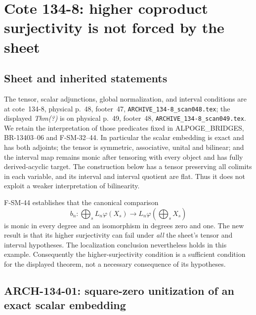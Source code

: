 \section{Cote 134-8: higher coproduct surjectivity is not forced by the sheet}
\label{sec:arch134}

\subsection{Sheet and inherited statements}
The tensor, scalar adjunctions, global normalization, and interval conditions
are at cote~134-8, physical p.~48, footer~47,
\texttt{ARCHIVE\_134-8\_scan048.tex}; the displayed \emph{Thm(?)} is on
physical p.~49, footer~48, \texttt{ARCHIVE\_134-8\_scan049.tex}.
We retain the interpretation of those predicates fixed in
ALPOGE\_BRIDGES, BR-13403--06 and F-SM-32--44.  In particular the
scalar embedding is exact and has both adjoints; the tensor is symmetric,
associative, unital and bilinear; and the interval map remains monic after
tensoring with every object and has fully derived-acyclic target.
The construction below has a tensor preserving all colimits in each
variable, and its interval and interval quotient are flat.  Thus it does
not exploit a weaker interpretation of bilinearity.

F-SM-44 establishes that the canonical comparison
\[
 b_n:\bigoplus_s L_n\varphi(X_s)\longrightarrow
                  L_n\varphi\!\left(\bigoplus_sX_s\right)
\]
is monic in every degree and an isomorphism in degrees zero and one.
The new result is that its higher surjectivity can fail under \emph{all}
the sheet's tensor and interval hypotheses.  The localization conclusion
nevertheless holds in this example.  Consequently the higher-surjectivity
condition is a sufficient condition for the displayed theorem, not a
necessary consequence of its hypotheses.

\subsection{ARCH-134-01: square-zero unitization of an exact scalar embedding}

